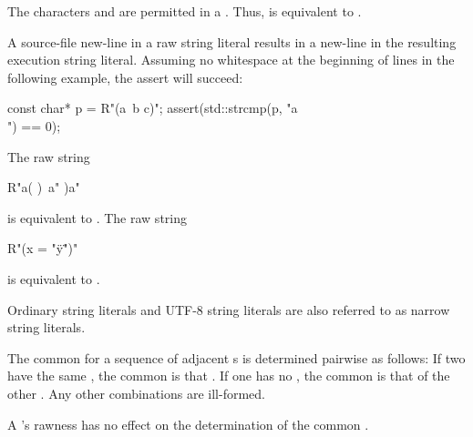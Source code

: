 \pnum
\begin{note}
The characters  and  are permitted in a
. Thus,  is equivalent to
.
\end{note}

\pnum
\begin{note}
A source-file new-line in a raw string literal results in a new-line in the
resulting execution string literal. Assuming no
whitespace at the beginning of lines in the following example, the assert will succeed:
\begin{codeblock}
const char* p = R"(a\
b
c)";
assert(std::strcmp(p, "a\\\nb\nc") == 0);
\end{codeblock}
\end{note}

\pnum
\begin{example}
The raw string
\begin{codeblock}
R"a(
)\
a"
)a"
\end{codeblock}
is equivalent to . The raw string
\begin{codeblock}
R"(x = "\"y\"")"
\end{codeblock}
is equivalent to .
\end{example}

\pnum
{}%
%
Ordinary string literals and UTF-8 string literals are
also referred to as narrow string literals.

\pnum
{}%
The common 
for a sequence of adjacent s
is determined pairwise as follows:
If two {s} have
the same ,
the common  is that .
If one  has no \grammarterm{encoding-prefix},
the common \grammarterm{encoding-prefix} is that
of the other .
Any other combinations are ill-formed.
\begin{note}
A \grammarterm{string-literal}'s rawness has
no effect on the determination of the common .
\end{note}

